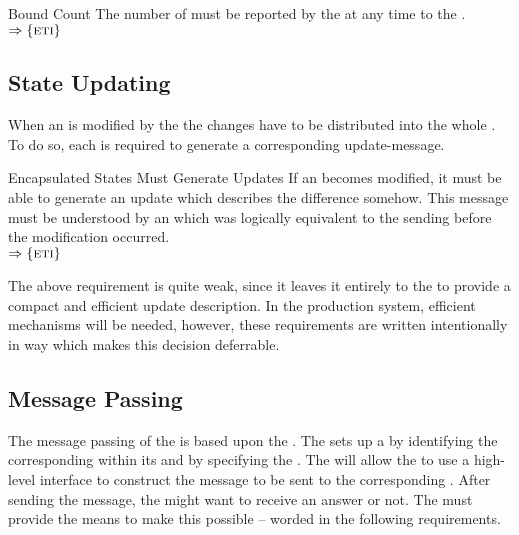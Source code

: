\documentclass[a4paper, 12pt]{book}
\newcommand{\INTERFACE}[1]{$\Rightarrow\left\{#1\right\}$}
\begin{document}
\begin{requirement*}{Bound Count}
  The number of  must be reported by the 
  at any time to the \SYNEIGHT.\\
  \INTERFACE{\ETI}
\end{requirement*}


\subsection{State Updating}

When an  is modified by the  the changes
have to be distributed into the whole . To do so,
each  is required to generate a corresponding
update-message. 

\begin{requirement*}{Encapsulated States Must Generate Updates}
  If an  becomes modified, it must be
  able to generate an update which describes the difference somehow. This
  message must be understood by an  which was logically
  equivalent to the sending  before the modification
  occurred.\\
  \INTERFACE{\ETI}
\end{requirement*}
%
The above requirement is quite weak, since it leaves it entirely to the
 to provide a compact and efficient
update description. In the production system, efficient mechanisms will be
needed, however, these requirements are written intentionally in way which
makes this decision deferrable. 


\subsection{Message Passing}

The message passing of the \SYNEIGHT is based upon the . The  sets up a  by identifying the
corresponding  within its  and by specifying the
. The  will allow the  to use
a high-level interface to construct the message to be sent to the
corresponding . After sending the message, the  might
want to receive an answer or not.
%
The \SYNEIGHT must provide the means to make this possible -- worded in
the following requirements.
\end{document}
